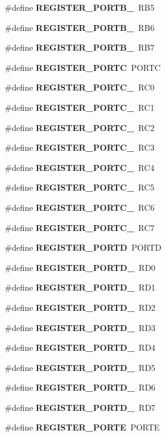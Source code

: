 \begin{DoxyCompactItemize}
\item 
\#define {\bf R\-E\-G\-I\-S\-T\-E\-R\-\_\-\-P\-O\-R\-T\-B\-\_}~R\-B5
\item 
\#define {\bf R\-E\-G\-I\-S\-T\-E\-R\-\_\-\-P\-O\-R\-T\-B\-\_}~R\-B6
\item 
\#define {\bf R\-E\-G\-I\-S\-T\-E\-R\-\_\-\-P\-O\-R\-T\-B\-\_}~R\-B7
\item 
\#define {\bf R\-E\-G\-I\-S\-T\-E\-R\-\_\-\-P\-O\-R\-T\-C}~P\-O\-R\-T\-C
\item 
\#define {\bf R\-E\-G\-I\-S\-T\-E\-R\-\_\-\-P\-O\-R\-T\-C\-\_}~R\-C0
\item 
\#define {\bf R\-E\-G\-I\-S\-T\-E\-R\-\_\-\-P\-O\-R\-T\-C\-\_}~R\-C1
\item 
\#define {\bf R\-E\-G\-I\-S\-T\-E\-R\-\_\-\-P\-O\-R\-T\-C\-\_}~R\-C2
\item 
\#define {\bf R\-E\-G\-I\-S\-T\-E\-R\-\_\-\-P\-O\-R\-T\-C\-\_}~R\-C3
\item 
\#define {\bf R\-E\-G\-I\-S\-T\-E\-R\-\_\-\-P\-O\-R\-T\-C\-\_}~R\-C4
\item 
\#define {\bf R\-E\-G\-I\-S\-T\-E\-R\-\_\-\-P\-O\-R\-T\-C\-\_}~R\-C5
\item 
\#define {\bf R\-E\-G\-I\-S\-T\-E\-R\-\_\-\-P\-O\-R\-T\-C\-\_}~R\-C6
\item 
\#define {\bf R\-E\-G\-I\-S\-T\-E\-R\-\_\-\-P\-O\-R\-T\-C\-\_}~R\-C7
\item 
\#define {\bf R\-E\-G\-I\-S\-T\-E\-R\-\_\-\-P\-O\-R\-T\-D}~P\-O\-R\-T\-D
\item 
\#define {\bf R\-E\-G\-I\-S\-T\-E\-R\-\_\-\-P\-O\-R\-T\-D\-\_}~R\-D0
\item 
\#define {\bf R\-E\-G\-I\-S\-T\-E\-R\-\_\-\-P\-O\-R\-T\-D\-\_}~R\-D1
\item 
\#define {\bf R\-E\-G\-I\-S\-T\-E\-R\-\_\-\-P\-O\-R\-T\-D\-\_}~R\-D2
\item 
\#define {\bf R\-E\-G\-I\-S\-T\-E\-R\-\_\-\-P\-O\-R\-T\-D\-\_}~R\-D3
\item 
\#define {\bf R\-E\-G\-I\-S\-T\-E\-R\-\_\-\-P\-O\-R\-T\-D\-\_}~R\-D4
\item 
\#define {\bf R\-E\-G\-I\-S\-T\-E\-R\-\_\-\-P\-O\-R\-T\-D\-\_}~R\-D5
\item 
\#define {\bf R\-E\-G\-I\-S\-T\-E\-R\-\_\-\-P\-O\-R\-T\-D\-\_}~R\-D6
\item 
\#define {\bf R\-E\-G\-I\-S\-T\-E\-R\-\_\-\-P\-O\-R\-T\-D\-\_}~R\-D7
\item 
\#define {\bf R\-E\-G\-I\-S\-T\-E\-R\-\_\-\-P\-O\-R\-T\-E}~P\-O\-R\-T\-E

\end{DoxyCompactItemize}
